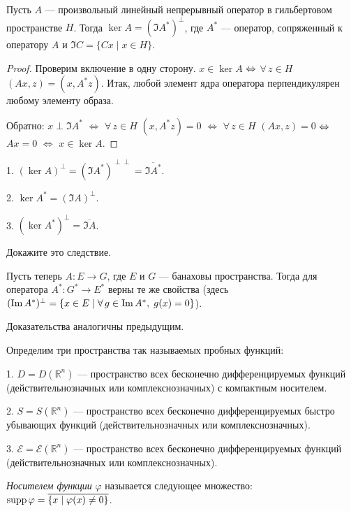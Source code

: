 \documentclass[10pt,titlepage, a4paper]{article}
\begin{document}
\begin{theorem}
Пусть $A$ --- произвольный линейный непрерывный оператор в
гильбертовом пространстве $H$. Тогда $\ker A=(\Im A^*)^{\perp}$, где
$A^*$ --- оператор, сопряженный к оператору $A$ и $\Im C=\{Cx\mid
x\in H\}$.
\end{theorem}

\begin{proof}
Проверим включение в одну сторону. $x\in \ker A$ $\p\Leftrightarrow$
$\forall\, z\in H$ \;\;$(Ax,z)=(x,A^*z)$. Итак, любой элемент ядра
оператора перпендикулярен любому элементу образа.

Обратно: $x\perp \Im A^*$ $\Leftrightarrow$ $\forall\, z\in H$\;\;
$(x,A^*z)=0$ $\Leftrightarrow$ $\forall\, z\in H$ \;\;$(Ax,z)=0$
$\p\Leftrightarrow$ $Ax=0$ $\Leftrightarrow$ $x\in \ker A$.
\end{proof}

\begin{sled}
1. $(\ker A)^{\perp}=(\Im A^*)^{\perp\perp}=\overline{\Im A^*}$.

2. $\ker A^*=(\Im A)^{\perp}$.

3. $(\ker A^*)^{\perp}=\overline{\Im A}$.
\end{sled}

\begin{upr}
Докажите это следствие.
\end{upr}

Пусть теперь $A\colon E\to G$, где $E$ и $G$ --- банаховы
пространства. Тогда для оператора $A^*\colon G^*\to E^*$ верны те же
свойства (здесь $(\Im A^*)^{\perp}=\{x\p\in E\mid\forall\, g\p\in
\Im A^*,\; g(x)=0\}$).

Доказательства аналогичны предыдущим.


Определим три пространства так называемых пробных функций:

1. $D=D(\mathbb{R}^n)$ --- пространство всех бесконечно
дифференцируемых функций (действительнозначных или
комплекснозначных) с компактным носителем.

2. $S=S(\mathbb{R}^n)$ --- пространство всех бесконечно
дифференцируемых быстро убывающих функций (действительнозначных или
комплекснозначных).

3. $\mathcal{E}=\mathcal{E}(\mathbb{R}^n)$ --- пространство всех
бесконечно дифференцируемых функций (действительнозначных или
комплекснозначных).

\begin{defen}
\emph{Носителем функции} $\varphi$ называется следующее множество:
$\mathop{\mathrm{supp}}\varphi=\overline{\{x\mid \varphi(x)\neq0\}}$.
\end{defen}
\end{document}
